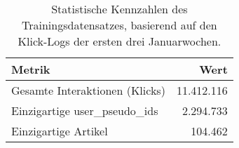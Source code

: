 
\begin{table}[H]
    \centering
    \caption{Statistische Kennzahlen des Trainingsdatensatzes, basierend auf den Klick-Logs der ersten drei Januarwochen.}
    \label{tab:train_stats}
    \begin{tabular}{lr}
        \toprule
        \textbf{Metrik} & \textbf{Wert} \\
        \midrule
        Gesamte Interaktionen (Klicks) & 11.412.116 \\
        Einzigartige user\_pseudo\_ids & 2.294.733 \\
        Einzigartige Artikel & 104.462 \\
        \bottomrule
    \end{tabular}
\end{table}